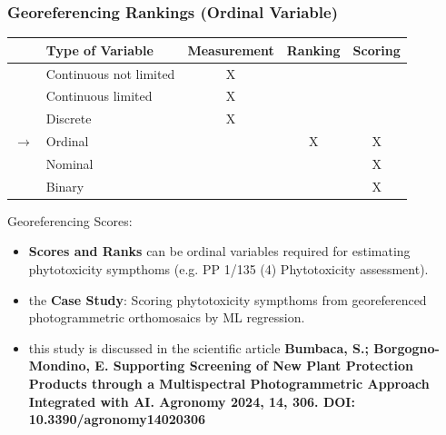 \documentclass[aspectratio=43]{beamer}
\begin{document}
\begin{frame}
    \frametitle{Georeferencing Rankings (Ordinal Variable)}
    \begin{table}[ht]
        \centering
        \begin{tabular}{|c|l|c|c|c|}
        \hline
        & \textbf{Type of Variable} & \textbf{Measurement} & \textbf{Ranking} & \textbf{Scoring} \\
        \hline
        \rowcolor{green!20} & Continuous not limited & X & & \\
        \hline
        \rowcolor{green!20} & Continuous limited & X & & \\
        \hline
        \rowcolor{yellow!20} & Discrete & X & & \\
        \hline
        \rowcolor{red!20} $\rightarrow$ & Ordinal & & X & X \\
        \hline
        \rowcolor{red!20} & Nominal & & & X \\
        \hline
        \rowcolor{red!20} & Binary & & & X \\
        \hline
        \end{tabular}
    \end{table}
    \begin{block}{Georeferencing Scores:}
        \small
        \begin{itemize}
            \item \textbf{Scores and Ranks} can be ordinal variables required for estimating phytotoxicity sympthoms (e.g. PP 1/135 (4) Phytotoxicity assessment).
            \item the \textbf{Case Study}: Scoring phytotoxicity sympthoms from georeferenced photogrammetric orthomosaics by ML regression. 
            \item this study is discussed in the scientific article \textbf{\scriptsize Bumbaca, S.; Borgogno-Mondino, E. Supporting Screening of New Plant Protection Products through a Multispectral Photogrammetric Approach Integrated with AI. Agronomy 2024, 14, 306. DOI: 10.3390/agronomy14020306}
        \end{itemize}
    \end{block}
\end{frame}

\end{document}
